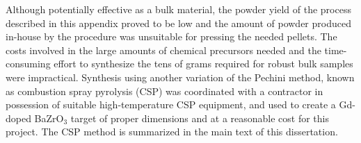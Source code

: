Although potentially effective as a bulk material, the powder yield of the process described in this appendix proved to be low and the amount of powder produced in-house by the procedure was unsuitable for pressing the needed pellets. The costs involved in the large amounts of chemical precursors needed and the time-consuming effort to synthesize the tens of grams required for robust bulk samples were impractical. Synthesis using another variation of the Pechini method, known as combustion spray pyrolysis (CSP) was coordinated with a contractor in possession of suitable high-temperature CSP equipment, and used to create a Gd-doped BaZrO$_3$ target of proper dimensions and at a reasonable cost for this project. The CSP method is summarized in the main text of this dissertation.
